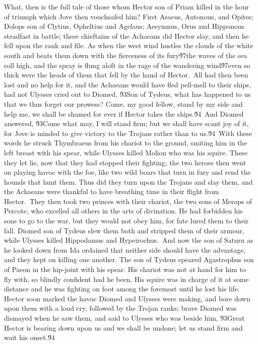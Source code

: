 {What, then is the full tale of those whom Hector son of Priam killed in the hour of triumph which Jove then vouchsafed him? First Asaeus, Autonous, and Opites; Dolops son of Clytius, Opheltius and Agelaus; Aesymnus, Orus and Hipponous steadfast in battle; these chieftains of the Achaeans did Hector slay, and then he fell upon the rank and file. As when the west wind hustles the clouds of the white south and beats them down with the fierceness of its fury\'97the waves of the sea roll high, and the spray is flung aloft in the rage of the wandering wind\'97even so thick were the heads of them that fell by the hand of Hector.\
All had then been lost and no help for it, and the Achaeans would have fled pell-mell to their ships, had not Ulysses cried out to Diomed, \'93Son of Tydeus, what has happened to us that we thus forget our prowess? Come, my good fellow, stand by my side and help me, we shall be shamed for ever if Hector takes the ships.\'94\
And Diomed answered, \'93Come what may, I will stand firm; but we shall have scant joy of it, for Jove is minded to give victory to the Trojans rather than to us.\'94\
With these words he struck Thymbraeus from his chariot to the ground, smiting him in the left breast with his spear, while Ulysses killed Molion who was his squire. These they let lie, now that they had stopped their fighting; the two heroes then went on playing havoc with the foe, like two wild boars that turn in fury and rend the hounds that hunt them. Thus did they turn upon the Trojans and slay them, and the Achaeans were thankful to have breathing time in their flight from Hector.\
They then took two princes with their chariot, the two sons of Merops of Percote, who excelled all others in the arts of divination. He had forbidden his sons to go to the war, but they would not obey him, for fate lured them to their fall. Diomed son of Tydeus slew them both and stripped them of their armour, while Ulysses killed Hippodamus and Hypeirochus.\
And now the son of Saturn as he looked down from Ida ordained that neither side should have the advantage, and they kept on killing one another. The son of Tydeus speared Agastrophus son of Paeon in the hip-joint with his spear. His chariot was not at hand for him to fly with, so blindly confident had he been. His squire was in charge of it at some distance and he was fighting on foot among the foremost until he lost his life. Hector soon marked the havoc Diomed and Ulysses were making, and bore down upon them with a loud cry, followed by the Trojan ranks; brave Diomed was dismayed when he saw them, and said to Ulysses who was beside him, \'93Great Hector is bearing down upon us and we shall be undone; let us stand firm and wait his onset.\'94\
}
